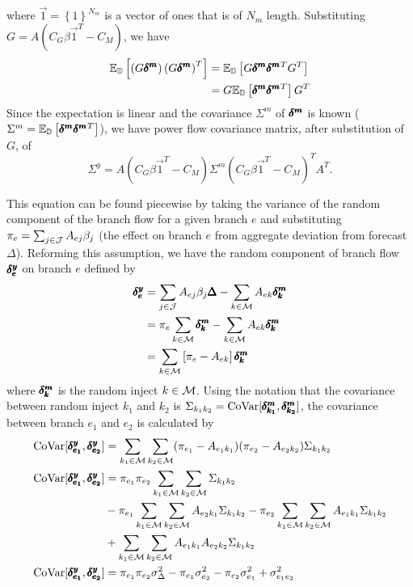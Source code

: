 where $\vec{1} = \left\{ 1 \right\}^{N_m}$ is a vector of ones that is of $N_m$ length.  Substituting $G=A(C_G\beta \vec{1}^T - C_M)$, we have
\begin{align*}
 \mathbb{E}_{\mathbb{D}} \left[ \left( G \pmb{\delta^m} \right) \left( G \pmb{\delta^m} \right)^T  \right] &=  \mathbb{E}_{\mathbb{D}} \left[  G  \pmb{\delta^m} \pmb{\delta^m}^T G^T  \right] \\
 &= G  \mathbb{E}_{\mathbb{D}} \left[  \pmb{\delta^m} \pmb{\delta^m}^T  \right] G^T 
\end{align*}
Since the expectation is linear and the covariance $\Sigma^m$ of $\pmb{\delta^m}$ is known ($\Sigma^m = \mathbb{E}_{\mathbb{D}} \left[ \pmb{\delta^m} \pmb{\delta^m}^T \right]$), we have power flow covariance matrix, after substitution of $G$, of
\begin{equation}\label{branch_cov}
\Sigma^y = A(C_G\beta \vec{1}^T - C_M) \Sigma^m (C_G\beta \vec{1}^T - C_M)^T A^T.
\end{equation}

This equation can be found piecewise by taking the variance of the random component of the branch flow for a given branch $e$ and substituting $\pi_e = \sum_{j \in \mathcal{J}} A_{ej} \beta_j$ (the effect on branch $e$ from aggregate deviation from forecast $\Delta$).  Reforming this assumption, we have the random component of branch flow $\pmb{\delta^y_e}$ on branch $e$ defined by
\begin{align*}
  \pmb{\delta^y_e} &= \sum_{j \in \mathcal{J}} A_{ej} \beta_j \pmb{\Delta} - \sum_{k \in \mathcal{M}} A_{ek} \pmb{\delta^m_k}\\
&= \pi_e \sum_{k \in \mathcal{M}} \pmb{\delta^m_k} - \sum_{k \in \mathcal{M}} A_{ek} \pmb{\delta^m_k}\\
&= \sum_{k \in \mathcal{M}} \left[ \pi_e  - A_{ek} \right] \pmb{\delta^m_k} 
\end{align*}
where $\pmb{\delta^m_k}$ is the random inject $k \in \mathcal{M}$. Using the notation that the covariance between random inject $k_1$ and $k_2$ is $\Sigma_{k_1 k_2} = \operatorname{CoVar}[ \pmb{\delta^m_{k_1}} ,\pmb{\delta^m_{k_2}} ]$, the covariance between branch $e_1$ and $e_2$ is calculated by
\begin{subequations}\label{covar_branch}
\begin{align}
\operatorname{CoVar}[ \pmb{\delta^y_{e_1}},\pmb{\delta^y_{e_2}} ] &=  \sum_{k_1 \in \mathcal{M}} \sum_{k_2 \in \mathcal{M}} (\pi_{e_1} - A_{e_1 k_1}) (\pi_{e_2} - A_{e_2 k_2}) \Sigma_{k_1 k_2} \\
\operatorname{CoVar}[ \pmb{\delta^y_{e_1}},\pmb{\delta^y_{e_2}} ] &=  \pi_{e_1} \pi_{e_2} \sum_{k_1 \in \mathcal{M}} \sum_{k_2 \in \mathcal{M}} \Sigma_{k_1 k_2} \\
& -  \pi_{e_1} \sum_{k_1 \in \mathcal{M}} \sum_{k_2 \in \mathcal{M}} A_{e_2 k_1} \Sigma_{k_1 k_2} - \pi_{e_2} \sum_{k_1 \in \mathcal{M}} \sum_{k_2 \in \mathcal{M}} A_{e_1 k_1} \Sigma_{k_1 k_2}   \\
&+ \sum_{k_1 \in \mathcal{M}} \sum_{k_2 \in \mathcal{M}} A_{e_1 k_1} A_{e_2 k_2} \Sigma_{k_1 k_2}  \\
\operatorname{CoVar}[ \pmb{\delta^y_{e_1}},\pmb{\delta^y_{e_2}} ] &=  \pi_{e_1} \pi_{e_2} \sigma_\Delta^2 -  \pi_{e_1} \sigma_{e_2}^2 - \pi_{e_2} \sigma_{e_1}^2   + \sigma_{e_1 e_2}^2
\end{align}
\end{subequations}
